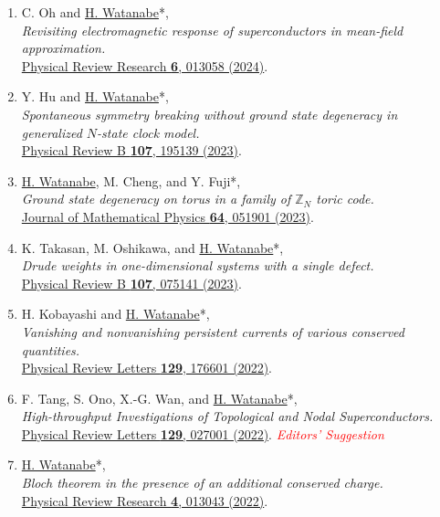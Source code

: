 \documentclass[letterpaper,11pt]{article}
\begin{document}
\begin{enumerate}
\item C. Oh and \underline{H. Watanabe}*, \\\emph{Revisiting electromagnetic response of superconductors in mean-field approximation.}\\{\href{https://doi.org/10.1103/PhysRevResearch.6.013058}{Physical Review Research {\bf 6}, 013058 (2024)}.}

\item Y. Hu and  \underline{H. Watanabe}*, \\\emph{Spontaneous symmetry breaking without ground state degeneracy in generalized $N$-state clock model.}\\{\href{https://doi.org/10.1103/PhysRevB.107.195139}{Physical Review B {\bf 107}, 195139 (2023)}.}

\item \underline{H. Watanabe}, M. Cheng, and Y. Fuji*, \\\emph{Ground state degeneracy on torus in a family of $\mathbb{Z}_N$ toric code.}\\{\href{https://doi.org/10.1063/5.0134010}{Journal of Mathematical Physics {\bf 64}, 051901 (2023)}.}

\item K. Takasan, M. Oshikawa, and \underline{H. Watanabe}*, \\\emph{Drude weights in one-dimensional systems with a single defect.}\\{\href{https://doi.org/10.1103/PhysRevB.107.075141}{Physical Review B {\bf 107}, 075141 (2023)}.}

\item H. Kobayashi and \underline{H. Watanabe}*, \\\emph{Vanishing and nonvanishing persistent currents of various conserved quantities.}\\{\href{https://doi.org/10.1103/PhysRevLett.129.176601}{Physical Review Letters {\bf 129}, 176601 (2022)}.}

\item F. Tang, S. Ono, X.-G. Wan, and \underline{H. Watanabe}*, \\\emph{High-throughput Investigations of Topological and Nodal Superconductors.}\\{\href{https://doi.org/10.1103/PhysRevLett.129.027001}{Physical Review Letters {\bf 129}, 027001 (2022)}. \emph{\small \textcolor{red}{Editors' Suggestion}}}

\item \underline{H. Watanabe}*, \\\emph{Bloch theorem in the presence of an additional conserved charge.}\\{\href{https://doi.org/10.1103/PhysRevResearch.4.013043}{Physical Review Research {\bf 4}, 013043 (2022)}.}


\end{enumerate}
\end{document}
